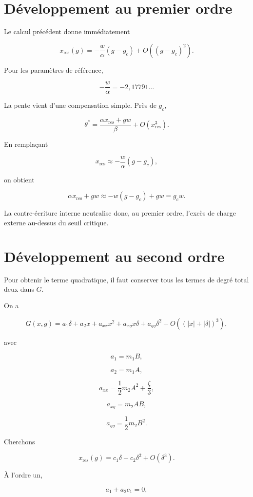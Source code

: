 \section{Développement au premier ordre}
\label{annexe-resistance-premier-ordre}

Le calcul précédent donne immédiatement

\[
\boxed{
x_{\mathrm{res}}(g)
=
-\frac{w}{\alpha}
(g-g_c)
+
O\left(
(g-g_c)^2
\right).
}
\]

Pour les paramètres de référence,

\[
-\frac{w}{\alpha}
=
-2{,}17791\ldots
\]

La pente vient d'une compensation simple. Près de \(g_c\),

\[
\theta^\ast
=
\frac{
\alpha x_{\mathrm{res}}
+
gw
}{\beta}
+
O(x_{\mathrm{res}}^3).
\]

En remplaçant

\[
x_{\mathrm{res}}
\approx
-\frac{w}{\alpha}(g-g_c),
\]

on obtient

\[
\alpha x_{\mathrm{res}}+gw
\approx
-w(g-g_c)+gw
=
g_cw.
\]

La contre-écriture interne neutralise donc, au premier ordre, l'excès
de charge externe au-dessus du seuil critique.

\section{Développement au second ordre}
\label{annexe-resistance-second-ordre}

Pour obtenir le terme quadratique, il faut conserver tous les termes
de degré total deux dans \(G\).

On a

\[
G(x,g)
=
a_1\delta
+
a_2x
+
a_{xx}x^2
+
a_{xg}x\delta
+
a_{gg}\delta^2
+
O\left(
(|x|+|\delta|)^3
\right),
\]

avec

\[
a_1=m_1B,
\]

\[
a_2=m_1A,
\]

\[
a_{xx}
=
\frac12m_2A^2
+
\frac{\zeta}{3},
\]

\[
a_{xg}
=
m_2AB,
\]

\[
a_{gg}
=
\frac12m_2B^2.
\]

Cherchons

\[
x_{\mathrm{res}}(g)
=
c_1\delta
+
c_2\delta^2
+
O(\delta^3).
\]

À l'ordre un,

\[
a_1+a_2c_1=0,
\]

